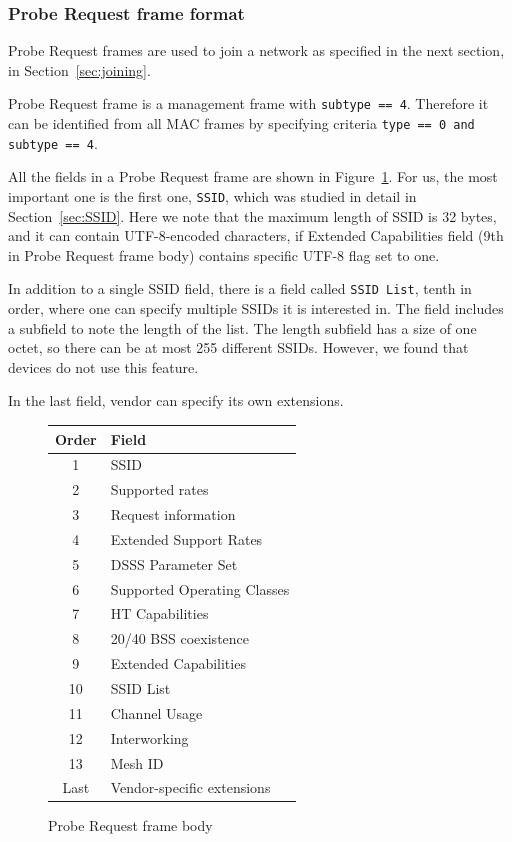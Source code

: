 \documentclass[12pt,a4paper,oneside,pdftex]{report}
\begin{document}
\subsubsection{Probe Request frame format}
\label{subsubsec:probe_request}

Probe Request frames are used to join a network as specified in the next section, in Section~\ref{sec:joining}.

Probe Request frame is a management frame with \texttt{subtype == 4}. Therefore it can be identified from all MAC frames by specifying criteria \texttt{type == 0 and subtype == 4}. 

All the fields in a Probe Request frame are shown in Figure~\ref{fig:probe_request}. For us, the most important one is the first one, \texttt{SSID}, which was studied in detail in Section~\ref{sec:SSID}. Here we note that the maximum length of SSID is 32 bytes, and it can contain UTF-8-encoded characters, if Extended Capabilities field (9th in Probe Request frame body) contains specific UTF-8 flag set to one.

In addition to a single SSID field, there is a field called \texttt{SSID List}, tenth in order, where one can specify multiple SSIDs it is interested in. The field includes a subfield to note the length of the list. The length subfield has a size of one octet, so there can be at most 255 different SSIDs. However, we found that devices do not use this feature.

In the last field, vendor can specify its own extensions.

\begin{figure}
\center
\label{fig:probe_request}
\begin{tabular}{|c|l|}
    \hline
    Order & Field \\ \hline
    \hline
    1 & SSID \\ \hline
    2 & Supported rates \\ \hline
    3 & Request information \\ \hline
    4 & Extended Support Rates \\ \hline
    5 & DSSS Parameter Set \\ \hline
    6 & Supported Operating Classes \\ \hline
    7 & HT Capabilities \\ \hline
    8 & 20/40 BSS coexistence \\ \hline
    9 & Extended Capabilities \\ \hline
    10 & SSID List \\ \hline
    11 & Channel Usage \\ \hline
    12 & Interworking \\ \hline
    13 & Mesh ID \\ \hline
    Last & Vendor-specific extensions \\ \hline
\end{tabular}
\caption{Probe Request frame body}
\end{figure}
\end{document}
